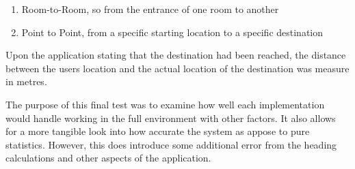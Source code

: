 \documentclass[main.tex]{subfiles}
\begin{document}
\begin{enumerate}
	\item Room-to-Room, so from the entrance of one room to another  %
	\item Point to Point, from a specific starting location to a specific destination  %
\end{enumerate}

Upon the application stating that the destination had been reached, the distance between the users location and the actual location of the destination was measure in metres.

The purpose of this final test was to examine how well each implementation would handle working in the full environment with other factors. It also allows for a more tangible look into how accurate the system as appose to pure statistics. However, this does introduce some additional error from the heading calculations and other aspects of the application.

\end{document}
